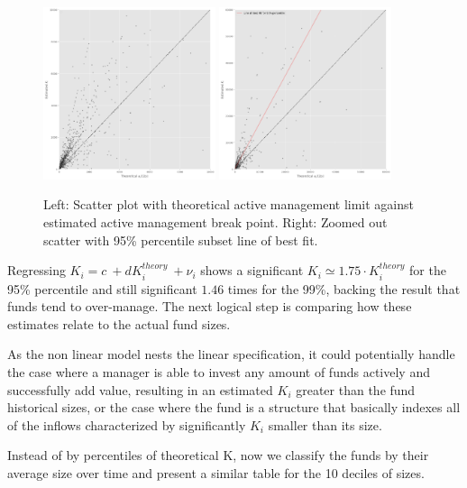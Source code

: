 \documentclass[12pt]{article}
\begin{document}
\begin{figure}[h!]
    \centering
    \includegraphics[width=0.45\textwidth]{K_K_theory_10000.png}
    \includegraphics[width=0.45\textwidth]{K_K_theory_60000_bestfit95.png}
    \caption{Left: Scatter plot with theoretical active management limit against estimated active management break point. Right: Zoomed out scatter with 95\% percentile subset line of best fit.}
    \label{fig:combined-scatter}
\end{figure}

Regressing $K_i = c\  + dK_i^{theory}\ + \nu_i$ shows a significant $K_i\simeq1.75·K_i^{theory}$ for the 95\% percentile and still significant $1.46$ times for the 99\%, backing the result that funds tend to over-manage. The next logical step is comparing how these estimates relate to the actual fund sizes.

\par
As the non linear model nests the linear specification, it could potentially handle the case where a manager is able to invest any amount of funds actively and successfully add value, resulting in an estimated $K_i$ greater than the fund historical sizes, or the case where the fund is a structure that basically indexes all of the inflows characterized by significantly $K_i$ smaller than its size. 

\par
Instead of by percentiles of theoretical K, now we classify the funds by their average size over time and present a similar table for the 10 deciles of sizes.
\end{document}
